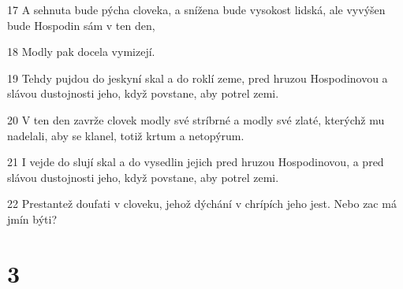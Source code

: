\par 17 A sehnuta bude pýcha cloveka, a snížena bude vysokost lidská, ale vyvýšen bude Hospodin sám v ten den,
\par 18 Modly pak docela vymizejí.
\par 19 Tehdy pujdou do jeskyní skal a do roklí zeme, pred hruzou Hospodinovou a slávou dustojnosti jeho, když povstane, aby potrel zemi.
\par 20 V ten den zavrže clovek modly své stríbrné a modly své zlaté, kterýchž mu nadelali, aby se klanel, totiž krtum a netopýrum.
\par 21 I vejde do slují skal a do vysedlin jejich pred hruzou Hospodinovou, a pred slávou dustojnosti jeho, když povstane, aby potrel zemi.
\par 22 Prestantež doufati v cloveku, jehož dýchání v chrípích jeho jest. Nebo zac má jmín býti?

\chapter{3}

